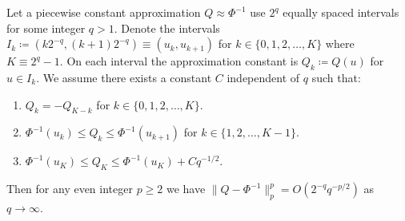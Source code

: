 \documentclass[manuscript,review]{acmart}
\begin{document}
\begin{theorem}
\label{thm:piecewise_constant_approximation_error}
Let a piecewise constant approximation $ Q \approx \Phi^{-1} $ use $ 2^q $ equally spaced intervals for some integer $ q > 1 $. Denote the intervals $ I_k \coloneqq (k2^{-q}, (k+1)2^{-q}) \equiv (u_k, u_{k+1}) $ for $ k \in \{0, 1, 2, \ldots, K\} $ where $ K \equiv 2^q - 1 $. On each interval the approximation constant is $ Q_k \coloneqq Q(u) $ for $ u \in I_k $. We assume there exists a constant $ C $ independent of $ q $ such that:
\begin{enumerate}
\item \label{con:symmetry} $ Q_k = -Q_{K-k} $ for $ k \in \{0,1,2,\ldots,K\} $. 
\item \label{con:intermediate_values} $ \Phi^{-1}(u_k) \leq Q_k \leq \Phi^{-1}(u_{k+1}) $ for $ k \in \{1,2, \ldots, K-1\} $.
\item \label{con:bounded_asymptotic_growth} $ \Phi^{-1}(u_K) \leq Q_K \leq \Phi^{-1}(u_K) + Cq^{-1/2} $.
\end{enumerate}
Then for any even integer $ p \geq 2 $ we have $ \lVert  Q - \Phi^{-1} \rVert_p^p = O(2^{-q}q^{-p/2})$ as $ q \rightarrow \infty $.
\end{theorem}
\end{document}
